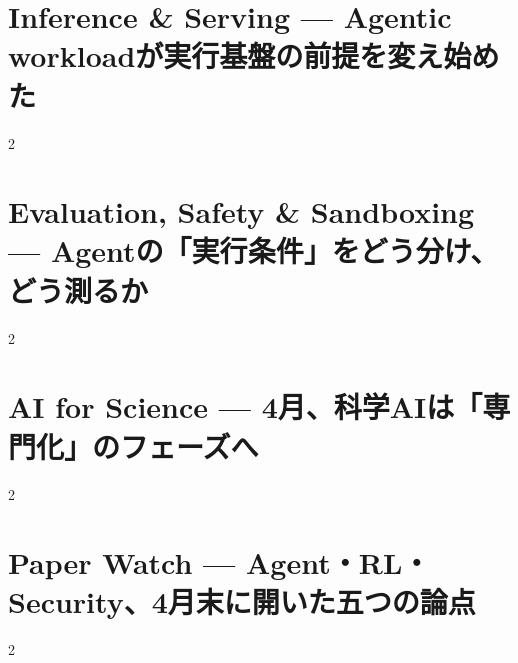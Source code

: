 \documentclass[lualatex,a4paper,11pt]{jlreq}
\begin{document}
\section{Inference \& Serving — Agentic workloadが実行基盤の前提を変え始めた}
\label{pkg:inference-serving-april}
\vspace{0.15em}

\vspace{0.2em}
\begin{multicols}{2}

\end{multicols}

\medskip


\Needspace{0.45\textheight}
\bigskip
\section{Evaluation, Safety \& Sandboxing — Agentの「実行条件」をどう分け、どう測るか}
\label{pkg:evaluation-safety-sandbox-april}
\vspace{0.15em}

\vspace{0.2em}
\begin{multicols}{2}

\end{multicols}

\medskip


\Needspace{0.45\textheight}
\bigskip
\section{AI for Science — 4月、科学AIは「専門化」のフェーズへ}
\label{pkg:ai-science-april}
\vspace{0.15em}

\vspace{0.2em}
\begin{multicols}{2}

\end{multicols}

\medskip


\Needspace{0.45\textheight}
\bigskip
\section{Paper Watch — Agent・RL・Security、4月末に開いた五つの論点}
\label{pkg:paper-watch-april}
\vspace{0.15em}

\vspace{0.2em}
\begin{multicols}{2}

\end{multicols}

\medskip


\Needspace{0.30\textheight}
\bigskip
\printbibliography[title={References / Source Notes}]
\end{document}
